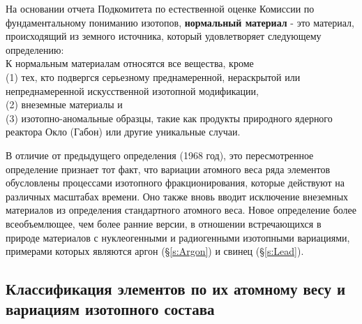 \documentclass[a5paper,openany]{book}
\begin{document}
На основании отчета Подкомитета по естественной оценке Комиссии по фундаментальному пониманию изотопов, {\bf нормальный материал} - это материал, происходящий из земного источника, который
удовлетворяет следующему определению: \\ 
К нормальным материалам относятся все вещества, кроме \\
(1) тех, кто подвергся серьезному преднамеренной, нераскрытой или непреднамеренной искусственной изотопной модификации, \\
(2) внеземные материалы и \\
(3) изотопно-аномальные образцы, такие как продукты природного ядерного реактора Окло (Габон) или другие уникальные случаи.

В отличие от предыдущего определения (1968 год), это пересмотренное определение признает тот факт, что вариации атомного веса ряда элементов обусловлены процессами изотопного фракционирования, которые действуют на различных масштабах времени. Оно также вновь вводит исключение внеземных материалов из определения стандартного атомного веса. Новое определение более всеобъемлющее, чем более ранние версии, в отношении встречающихся в природе материалов с нуклеогенными и радиогенными изотопными вариациями, примерами которых являются аргон \cite{IUPACArgon} (\S\ref{s:Argon}) и свинец \cite{IUPACLead} (\S\ref{s:Lead}).

\subsection{Классификация элементов по их атомному весу и вариациям изотопного состава}
\end{document}
